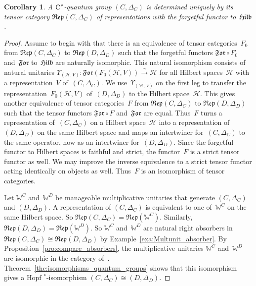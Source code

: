 \documentclass[a4paper]{amsart}
\numberwithin{equation}{section}
\theoremstyle{plain}
\numberwithin{theorem}{section}
\newtheorem{corollary}[theorem]{Corollary}
\theoremstyle{definition}
\theoremstyle{remark}
\newcommand*{\Hilb}{\mathfrak{Hilb}}%
\newcommand*{\Corepcat}[1]{\mathfrak{Rep}(#1)}%
\newcommand*{\Forget}{\mathfrak{For}}%
\newcommand*{\nb}{\nobreakdash}
\newcommand*{\Star}{$^*$\nb-}
\newcommand*{\Comult}[1][]{\Delta_{#1}}%
\newcommand*{\congto}{\xrightarrow\sim}%
\newcommand*{\Multunit}[1][]{\mathbb W^{#1}}%
\newcommand*{\Cst}{\textup C^*}%
\newcommand*{\Hils}[1][H]{\mathcal{#1}}%
\begin{document}
\begin{corollary}
  \label{cor:Tannaka-Krein}
  A \(\Cst\)\nb-quantum
  group \((C,\Comult[C])\)
  is determined uniquely by its tensor category
  \(\Corepcat{C,\Comult[C]}\)
  of representations with the forgetful functor to~\(\Hilb\).
\end{corollary}

\begin{proof}
  Assume to begin with that there is an equivalence of tensor
  categories~\(F_0\)
  from \(\Corepcat{C,\Comult[C]}\)
  to \(\Corepcat{D,\Comult[D]}\)
  such that the forgetful functors \(\Forget\circ F_0\)
  and~\(\Forget\)
  to~\(\Hilb\)
  are naturally isomorphic.  This natural isomorphism consists of
  natural unitaries
  \(\Upsilon_{(\Hils,V)}\colon \Forget(F_0(\Hils,V)) \congto \Hils\)
  for all Hilbert spaces~\(\Hils\)
  with a representation~\(V\)
  of~\((C,\Comult[C])\).
  We use~\(\Upsilon_{(\Hils,V)}\)
  on the first leg to transfer the representation~\(F_0(\Hils,V)\)
  of~\((D,\Comult[D])\)
  to the Hilbert space~\(\Hils\).
  This gives another equivalence of tensor categories~\(F\)
  from \(\Corepcat{C,\Comult[C]}\)
  to \(\Corepcat{D,\Comult[D]}\)
  such that the tensor functors \(\Forget\circ F\)
  and~\(\Forget\)
  are equal.  Thus~\(F\)
  turns a representation of~\((C,\Comult[C])\)
  on a Hilbert space~\(\Hils\)
  into a representation of~\((D,\Comult[D])\)
  on the same Hilbert space and maps an intertwiner
  for~\((C,\Comult[C])\)
  to the same operator, now as an intertwiner for~\((D,\Comult[D])\).
  Since the forgetful functor to Hilbert spaces is faithful and
  strict, the functor~\(F\)
  is a strict tensor functor as well.  We may improve the inverse
  equivalence to a strict tensor functor acting identically on objects
  as well.  Thus~\(F\) is an isomorphism of tensor categories.

  Let \(\Multunit[C]\)
  and~\(\Multunit[D]\)
  be manageable multiplicative unitaries that generate
  \((C,\Comult[C])\)
  and \((D,\Comult[D])\).
  A representation of \((C,\Comult[C])\)
  is equivalent to one of~\(\Multunit[C]\)
  on the same Hilbert space.  So
  \(\Corepcat{C,\Comult[C]} = \Corepcat{\Multunit[C]}\).
  Similarly, \(\Corepcat{D,\Comult[D]} = \Corepcat{\Multunit[D]}\).
  So \(\Multunit[C]\)
  and~\(\Multunit[D]\)
  are natural right absorbers in
  \(\Corepcat{C,\Comult[C]} \cong \Corepcat{D,\Comult[D]}\)
  by Example~\ref{exa:Multunit_absorber}.  By
  Proposition~\ref{pro:compare_absorbers}, the multiplicative
  unitaries \(\Multunit[C]\)
  and~\(\Multunit[D]\)
  are isomorphic in the category
  of~\cite{Meyer-Roy-Woronowicz:Homomorphisms}.
  Theorem~\ref{the:isomorphisms_quantum_groups} shows that this
  isomorphism gives a Hopf \Star{}isomorphism
  \((C,\Comult[C]) \cong (D,\Comult[D])\).
\end{proof}
\end{document}
